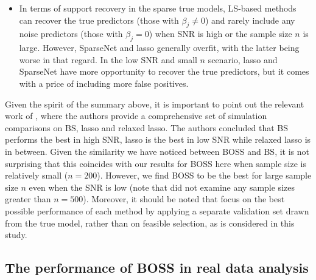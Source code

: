 \begin{itemize}
	\item In terms of support recovery in the sparse true models, LS-based methods can recover the true predictors (those with $\beta_j \ne 0$) and rarely include any noise predictors (those with $\beta_j = 0$) when SNR is high or the sample size $n$ is large. However, SparseNet and lasso generally overfit, with the latter being worse in that regard. In the low SNR and small $n$ scenario, lasso and SparseNet have more opportunity to recover the true predictors, but it comes with a price of including more false positives. 

\end{itemize}


Given the spirit of the summary above, it is important to point out the relevant work of \citet{Hastie2017}, where the authors provide a comprehensive set of simulation comparisons on BS, lasso and relaxed lasso. The authors concluded that BS performs the best in high SNR, lasso is the best in low SNR while relaxed lasso is in between. Given the similarity we have noticed between BOSS and BS, it is not surprising that this coincides with our results for BOSS here when sample size is relatively small ($n=200$). However, we find BOSS to be the best for large sample size $n$ even when the SNR is low (note that \citet{Hastie2017} did not examine any sample sizes greater than $n=500$). Moreover, it should be noted that \citet{Hastie2017} focus on the best possible performance of each method by applying a separate validation set drawn from the true model, rather than on feasible selection, as is considered in this study. 






\subsection{The performance of BOSS in real data analysis}
\label{sec:real_data}

